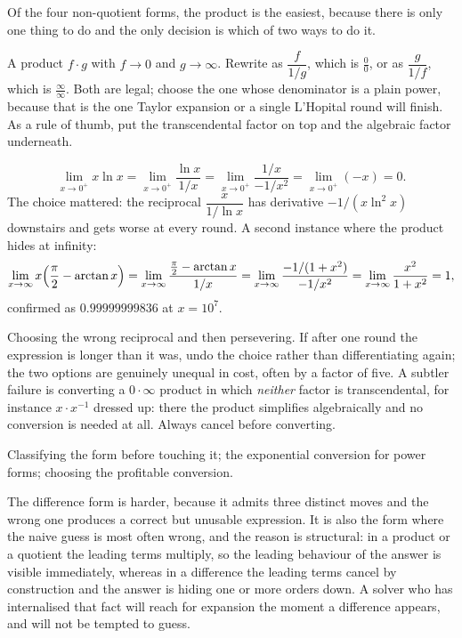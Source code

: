 Of the four non-quotient forms, the product is the easiest, because there is only one thing to do and the only decision is which of two ways to do it.

\cue A product $f\cdot g$ with $f\to0$ and $g\to\infty$.
\method Rewrite as $\dfrac{f}{1/g}$, which is $\tfrac00$, or as $\dfrac{g}{1/f}$, which is $\tfrac{\infty}{\infty}$. Both are legal; choose the one whose denominator is a plain power, because that is the one Taylor expansion or a single L'Hopital round will finish. As a rule of thumb, put the transcendental factor on top and the algebraic factor underneath.

\begin{worked}
\[
\lim_{x\to0^{+}}x\ln x=\lim_{x\to0^{+}}\frac{\ln x}{1/x}=\lim_{x\to0^{+}}\frac{1/x}{-1/x^{2}}=\lim_{x\to0^{+}}(-x)=0 .
\]
The choice mattered: the reciprocal $\dfrac{x}{1/\ln x}$ has derivative $-1/(x\ln^{2}x)$ downstairs and gets worse at every round. A second instance where the product hides at infinity:
\[
\lim_{x\to\infty}x\Bigl(\frac{\pi}{2}-\arctan x\Bigr)=\lim_{x\to\infty}\frac{\tfrac{\pi}{2}-\arctan x}{1/x}
=\lim_{x\to\infty}\frac{-1/(1+x^{2})}{-1/x^{2}}=\lim_{x\to\infty}\frac{x^{2}}{1+x^{2}}=1 ,
\]
confirmed as $0.99999999836$ at $x=10^{7}$.
\end{worked}

\begin{trap}
Choosing the wrong reciprocal and then persevering. If after one round the expression is longer than it was, undo the choice rather than differentiating again; the two options are genuinely unequal in cost, often by a factor of five. A subtler failure is converting a $0\cdot\infty$ product in which \emph{neither} factor is transcendental, for instance $x\cdot x^{-1}$ dressed up: there the product simplifies algebraically and no conversion is needed at all. Always cancel before converting.
\end{trap}

\begin{seealsob}Classifying the form before touching it; the exponential conversion for power forms; choosing the profitable conversion.\end{seealsob}

The difference form is harder, because it admits three distinct moves and the wrong one produces a correct but unusable expression. It is also the form where the naive guess is most often wrong, and the reason is structural: in a product or a quotient the leading terms multiply, so the leading behaviour of the answer is visible immediately, whereas in a difference the leading terms cancel by construction and the answer is hiding one or more orders down. A solver who has internalised that fact will reach for expansion the moment a difference appears, and will not be tempted to guess.

